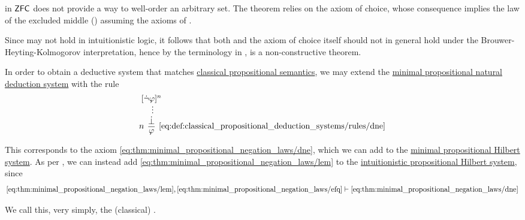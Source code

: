 \begin{example}\label{ex:con:brouwer_heyting_kolmogorov_interpretation/well_ordering_principle_zfc}
   in \hyperref[def:zfc]{\( \textsf{ZFC} \)} does not provide a way to well-order an arbitrary set. The theorem relies on the axiom of choice, whose consequence  implies the law of the excluded middle () assuming the axioms of .

  Since  may not hold in intuitionistic logic, it follows that both  and the axiom of choice itself should not in general hold under the Brouwer-Heyting-Kolmogorov interpretation, hence by the terminology in ,  is a non-constructive theorem.
\end{example}

\begin{definition}\label{def:classical_propositional_deduction_systems}
  In order to obtain a deductive system that matches \hyperref[def:propositional_entailment]{classical propositional semantics}, we may extend the \hyperref[def:minimal_propositional_natural_deduction_system]{minimal propositional natural deduction system} with the rule
  \begin{equation*}\taglabel[\logic{DNE}]{eq:def:classical_propositional_deduction_systems/rules/dne}
    \begin{prooftree}
      \hypo{ [\synneg \varphi]^n }
      \ellipsis {} { \synbot }
      \infer[left label=\( n \)]1[\ref{eq:def:classical_propositional_deduction_systems/rules/dne}]{ \varphi }
    \end{prooftree}
  \end{equation*}

  This corresponds to the axiom \eqref{eq:thm:minimal_propositional_negation_laws/dne}, which we can add to the \hyperref[def:minimal_propositional_hilbert_system]{minimal propositional Hilbert system}. As per , we can instead add \eqref{eq:thm:minimal_propositional_negation_laws/lem} to the \hyperref[def:intuitionistic_propositional_deduction_systems]{intuitionistic propositional Hilbert system}, since
  \begin{equation*}
    \eqref{eq:thm:minimal_propositional_negation_laws/lem}, \eqref{eq:thm:minimal_propositional_negation_laws/efq} \vdash \eqref{eq:thm:minimal_propositional_negation_laws/dne}
  \end{equation*}

  We call this, very simply, the (classical) .
\end{definition}

